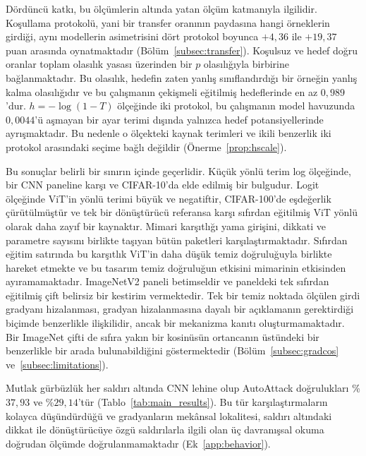 Dördüncü katkı, bu ölçümlerin altında yatan ölçüm katmanıyla ilgilidir. Koşullama protokolü, yani bir transfer oranının paydasına hangi örneklerin girdiği, aynı modellerin asimetrisini dört protokol boyunca $+4{,}36$ ile $+19{,}37$ puan arasında oynatmaktadır (Bölüm~\ref{subsec:transfer}). Koşulsuz ve hedef doğru oranlar toplam olasılık yasası üzerinden bir $p$ olasılığıyla birbirine bağlanmaktadır. Bu olasılık, hedefin zaten yanlış sınıflandırdığı bir örneğin yanlış kalma olasılığıdır ve bu çalışmanın çekişmeli eğitilmiş hedeflerinde en az $0{,}989$'dur. $h = -\log(1-T)$ ölçeğinde iki protokol, bu çalışmanın model havuzunda $0{,}0044$'ü aşmayan bir ayar terimi dışında yalnızca hedef potansiyellerinde ayrışmaktadır. Bu nedenle o ölçekteki kaynak terimleri ve ikili benzerlik iki protokol arasındaki seçime bağlı değildir (Önerme~\ref{prop:hscale}).

Bu sonuçlar belirli bir sınırın içinde geçerlidir. Küçük yönlü terim log ölçeğinde, bir CNN paneline karşı ve CIFAR-10'da elde edilmiş bir bulgudur. Logit ölçeğinde ViT'in yönlü terimi büyük ve negatiftir, CIFAR-100'de eşdeğerlik çürütülmüştür ve tek bir dönüştürücü referansa karşı sıfırdan eğitilmiş ViT yönlü olarak daha zayıf bir kaynaktır. Mimari karşıtlığı yama girişini, dikkati ve parametre sayısını birlikte taşıyan bütün paketleri karşılaştırmaktadır. Sıfırdan eğitim satırında bu karşıtlık ViT'in daha düşük temiz doğruluğuyla birlikte hareket etmekte ve bu tasarım temiz doğruluğun etkisini mimarinin etkisinden ayıramamaktadır. ImageNetV2 paneli betimseldir ve paneldeki tek sıfırdan eğitilmiş çift belirsiz bir kestirim vermektedir. Tek bir temiz noktada ölçülen girdi gradyanı hizalanması, gradyan hizalanmasına dayalı bir açıklamanın gerektirdiği biçimde benzerlikle ilişkilidir, ancak bir mekanizma kanıtı oluşturmamaktadır. Bir ImageNet çifti de sıfıra yakın bir kosinüsün ortancanın üstündeki bir benzerlikle bir arada bulunabildiğini göstermektedir (Bölüm~\ref{subsec:gradcos} ve~\ref{subsec:limitations}).

Mutlak gürbüzlük her saldırı altında CNN lehine olup AutoAttack doğrulukları \%$37{,}93$ ve \%$29{,}14$'tür (Tablo~\ref{tab:main_results}). Bu tür karşılaştırmaların kolayca düşündürdüğü ve gradyanların mekânsal lokalitesi, saldırı altındaki dikkat ile dönüştürücüye özgü saldırılarla ilgili olan üç davranışsal okuma doğrudan ölçümde doğrulanmamaktadır (Ek~\ref{app:behavior}).

